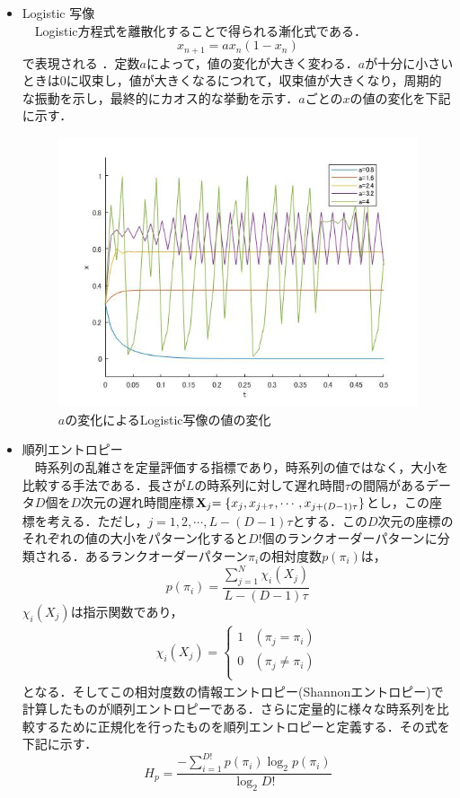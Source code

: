\documentclass[autodetect-engine,dvipdfmx-if-dvi,ja=standard,a4paper,11pt]{bxjsarticle} %
\begin{document}
\begin{itemize}
\item Logistic 写像\\%
　Logistic方程式を離散化することで得られる漸化式である．
\begin{equation}
x_{n+1}=ax_{n}(1-x_{n})
\end{equation}
で表現される \cite{logi} ．定数$a$によって，値の変化が大きく変わる．$a$が十分に小さいときは0に収束し，値が大きくなるにつれて，収束値が大きくなり，周期的な振動を示し，最終的にカオス的な挙動を示す．$a$ごとの$x$の値の変化を下記に示す．

\begin{figure}[H]%
\begin{center}
\includegraphics[width=.4\textwidth]{Logistic_result.jpg}
\end{center}
\caption{$a$の変化によるLogistic写像の値の変化}%
\label{fig:logstic}
\end{figure}


\item 順列エントロピー\\%
　時系列の乱雑さを定量評価する指標であり，時系列の値ではなく，大小を比較する手法である．長さが$L$の時系列に対して遅れ時間$\tau$の間隔があるデータ$D$個を$D$次元の遅れ時間座標${\bf X}_{\sl j}{\sl=\{ x_j,x_{j+\tau},\cdots ,x_{j+(D-1)\tau} \}} $とし，この座標を考える．ただし，$j=1,2,\cdots,L-(D-1)\tau$とする．この$D$次元の座標のそれぞれの値の大小をパターン化すると$D!$個のランクオーダーパターンに分類される．あるランクオーダーパターン$\pi_i$の相対度数$p(\pi_i)$は，
\begin{equation}
p(\pi_i)=\dfrac{\displaystyle\sum^N_{j=1}\chi_i(X_j)}{L-(D-1)\tau}
\end{equation}
$\chi_i(X_j)$は指示関数であり，
\begin{eqnarray}
\chi_i(X_j)=\left\{ \begin{array}{ll}
1 &  (\pi_j=\pi_i) \\
0 & (\pi_j\neq\pi_i) \\
\end{array} \right.
\end{eqnarray}
となる．そしてこの相対度数の情報エントロピー(Shannonエントロピー)で計算したものが順列エントロピーである．さらに定量的に様々な時系列を比較するために正規化を行ったものを順列エントロピーと定義する．その式を下記に示す．
\begin{equation}
H_p=\dfrac{-\displaystyle\sum_{i=1}^{D!} p(\pi_i) \log_2 p(\pi_i)}{\log_2 D!}
\end{equation}
\\


\end{itemize}
\end{document}
